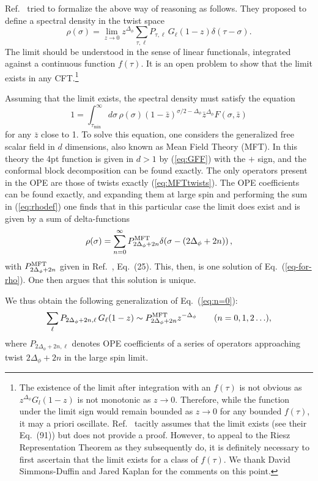 \documentclass[12pt]{article}
\newcommand{\reef}[1]{(\ref{#1})}
\newcommand{\beq}{\begin{equation}}
\newcommand{\eeq}{\end{equation}}
\newcommand{\Df}{{\Delta_\phi}}
\numberwithin{equation}{section}
\begin{document}
Ref.~\cite{Fitzpatrick:2012yx} tried to formalize the above way of reasoning as follows. They proposed to define a spectral density in the twist space
\beq
\label{eq:rhodef}
\rho(\sigma) = \lim _{z\to 0}z^{\Df}  \sum_{\tau,\ell} P_{\tau,\ell}\, G_{\ell}(1-z) \delta(\tau-\sigma).
\eeq
The limit should be understood in the sense of linear functionals, integrated against a continuous function $f(\tau)$. It is an open problem to show that the limit exists in any CFT.\footnote{The existence of the limit after integration with an  $f(\tau)$ is not obvious as $z^{\Df} G_l(1-z)$ is not monotonic as $z\to 0$. Therefore, while the function under the limit sign would remain bounded as $z\to0$ for any bounded $f(\tau)$, it may a priori oscillate. Ref.~\cite{Fitzpatrick:2012yx} tacitly assumes that the limit exists (see their Eq.~(91)) but does not provide a proof. However, to appeal to the Riesz Representation Theorem as they subsequently do, it is definitely necessary to first ascertain that the limit exists for a class of $f(\tau)$. We thank David Simmons-Duffin and Jared Kaplan for the comments on this point.}

Assuming that the limit exists, the spectral density must satisfy the equation
\beq
\label{eq-for-rho}
1=\int_{\tau_{\min}}^\infty d\sigma\, \rho(\sigma) (1-\bar z)^{\sigma/2-\Df} \bar z^{\Df} F(\sigma,\bar z)
\eeq
for any $\bar z$ close to 1. To solve this equation, one considers the generalized free scalar field in $d$ dimensions, also known as Mean Field Theory (MFT). In this theory the 4pt function is given in $d>1$ by \reef{eq:GFF} with the $+$ sign, and the conformal block decomposition can be found exactly. The only operators present in the OPE are those of twists exactly \reef{eq:MFTtwists}. The OPE coefficients can be found exactly, and expanding them at large spin and performing the sum in \reef{eq:rhodef} one finds that in this particular case the limit does exist and is given by a sum of delta-functions
\beq
\rho(\sigma) = \sum_{n=0}^\infty P^{\rm{MFT}}_{2\Df+2n}\delta(\sigma - (2\Df+2n))\,,
\eeq
with $P^{\rm{MFT}}_{2\Df+2n}$ given in Ref.~\cite{Fitzpatrick:2012yx}, Eq.~(25).
This, then, is one solution of Eq.~\reef{eq-for-rho}. One then argues that this solution is unique.

We thus obtain the following generalization of Eq.~\reef{eq:n=0}:
\beq
\label{eq:n-gen}
\sum_{\ell} P_{2\Df+2n,\ell}\, G_{\ell}(1-z) \sim P^{\rm{MFT}}_{2\Df+2n} z^{-{\Df}}\qquad(n=0,1,2\ldots),
\eeq
where $P_{2\Df+2n,\ell}$ denotes OPE coefficients of a series of operators approaching twist $2\Df+2n$ in the large spin limit.
\end{document}
